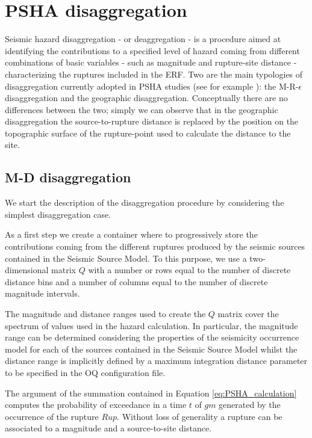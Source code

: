 %
\clearpage\newpage
\section{PSHA disaggregation}
\label{sec:disaggregation}
%
Seismic hazard disaggregation - or deaggregation - 
\citep{mcguire1995,bazzurro1999} is a procedure aimed at identifying the 
contributions to a specified level of hazard coming from different combinations
of basic variables - such as magnitude and rupture-site distance - 
characterizing the ruptures included in the ERF.
%
Two are the main typologies of disaggregation currently adopted in PSHA 
studies (see for example \citet{petersen2008}): the M-R-$\epsilon$ 
disaggregation and the geographic disaggregation. Conceptually there 
are no differences between the two; simply we can observe that in the 
geographic disaggregation the source-to-rupture distance is replaced by
the position on the topographic surface of the rupture-point used to 
calculate the distance to the site.
%

\subsection{M-D disaggregation}
We start the description of the disaggregation procedure by considering 
the  simplest disaggregation case. 

As a first step we create a container where to progressively store the 
contributions coming from the different ruptures produced by the seismic 
sources contained in the Seismic Source Model.
%
To this purpose, we use a two-dimensional matrix $Q$ with a number or 
rows equal to the number of discrete distance bins and a number of 
columns equal to the number of discrete magnitude intervals. 

The magnitude and distance ranges used to create the $Q$ matrix cover 
the spectrum of values used in the hazard calculation. In particular, 
the magnitude range can be determined considering the properties of 
the seismicity occurrence model for each of the sources contained in
the Seismic Source Model whilst the distance range is implicitly defined
by a maximum integration distance parameter to be specified in the OQ 
configuration file. 
%

The argument of the summation contained in Equation \ref{eq:PSHA_calculation} 
computes the probability of exceedance in a time $t$ of $gm$ generated by the 
occurrence of the rupture $Rup$. Without loss of generality a rupture can be
associated to a magnitude and a source-to-site distance.